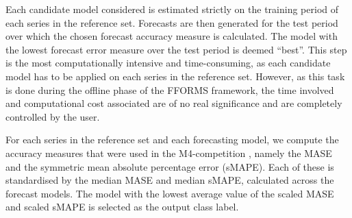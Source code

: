 \documentclass[11pt,a4paper,]{article}
\begin{document}
Each candidate model considered is estimated strictly on the training period of each series in the reference set. Forecasts are then generated for the test period over which the chosen forecast accuracy measure is calculated. The model with the lowest forecast error measure over the test period is deemed ``best''. This step is the most computationally intensive and time-consuming, as each candidate model has to be applied on each series in the reference set. However, as this task is done during the offline phase of the FFORMS framework, the time involved and computational cost associated are of no real significance and are completely controlled by the user.

For each series in the reference set and each forecasting model, we compute the accuracy measures that were used in the M4-competition \autocite{makridakis2019m4}, namely the MASE and the symmetric mean absolute percentage error (sMAPE). Each of these is standardised by the median MASE and median sMAPE, calculated across the forecast models. The model with the lowest average value of the scaled MASE and scaled sMAPE is selected as the output class label.
\end{document}
